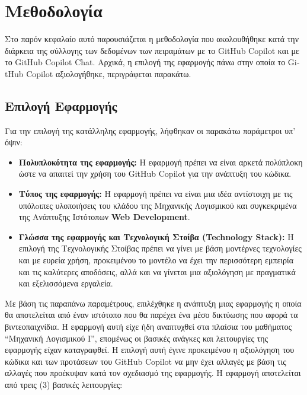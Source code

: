 \chapter{Μεθοδολογία}
\label{ch:chapter3}

Στο παρόν κεφαλαίο αυτό παρουσιάζεται η μεθοδολογία που ακολουθήθηκε
κατά την διάρκεια της σύλλογης των δεδομένων των πειραμάτων με το
\textlatin{GitHub Copilot} και με το \textlatin{GitHub Copilot Chat}.
Αρχικά, η επιλογή της εφαρμογής πάνω στην οποία το \textlatin{GitHub
Copilot} αξιολογήθηκε, περιγράφεται παρακάτω.

\section{Επιλογή Εφαρμογής}

Για την επιλογή της κατάλληλης εφαρμογής, λήφθηκαν οι παρακάτω
παράμετροι υπ' όψιν:

\begin{itemize}
  \item
    \textbf{Πολυπλοκότητα της εφαρμογής:} Η εφαρμογή πρέπει να είναι
    αρκετά πολύπλοκη ώστε να απαιτεί την χρήση του \textlatin{GitHub
    Copilot} για την ανάπτυξη του κώδικα.
  \item
    \textbf{Τύπος της εφαρμογής:} Η εφαρμογή πρέπει να είναι μια ιδέα
    αντίστοιχη με τις υπόλoιπες υλοποιήσεις του κλάδου της Μηχανικής
    Λογισμικού και συγκεκριμένα της Ανάπτυξης Ιστότοπων
    \textlatin{\textbf{Web Development}}.
  \item
    \textbf{Γλώσσα της εφαρμογής και Τεχνολογική Στοίβα
    (\textlatin{Technology Stack}):} Η επιλογή της Τεχνολογικής Στοίβας
    πρέπει να γίνει με βάση μοντέρνες τεχνολογίες και με ευρεία χρήση,
    προκειμένου το μοντέλο να έχει την περισσότερη εμπειρία και τις
    καλύτερες αποδόσεις, αλλά και να γίνεται μια αξιολόγηση με πραγματικά
    και εξελισσόμενα εργαλεία.
\end{itemize}

Με βάση τις παραπάνω παραμέτρους, επιλέχθηκε η ανάπτυξη μιας εφαρμογής η
οποία θα αποτελείται από έναν ιστότοπο που θα παρέχει ένα μέσο δικτύωσης
που αφορά τα βιντεοπαιχνίδια. Η εφαρμογή αυτή είχε ήδη αναπτυχθεί στα
πλαίσια του μαθήματος ``Μηχανική Λογισμικού Ι'', επομένως οι βασικές
ανάγκες και λειτουργίες της εφαρμογής είχαν καταγραφθεί. Η επιλογή αυτή
έγινε προκειμένου η αξιολόγηση του κώδικα και των προτάσεων του
\textlatin{GitHub Copilot} να μην έχει αλλαγές με βάση τις αλλαγές που
προέκυψαν κατά τον σχεδιασμό της εφαρμογής. Η εφαρμογή αποτελείται από
τρεις (3) βασικές λειτουργίες:

